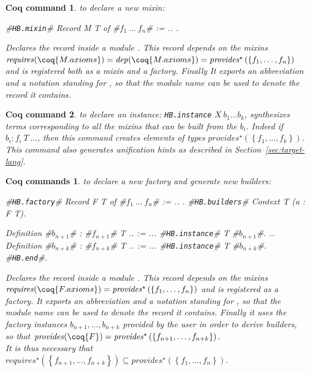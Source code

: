 \documentclass[a4paper,UKenglish,cleveref, autoref]{lipics-v2019}
\newcommand{\mixin}{mixin}
\newcommand{\mixins}{mixins}
\newcommand{\factory}{factory}
\newcommand{\phantterm}{abbreviation}
\newcommand{\mixinbuilders}{builders}
\newcommand{\factoryinstances}{factory instances}
\newcommand{\dep}{\ensuremath{\mathit{dep}}}
\newcommand{\requires}{\ensuremath{\mathit{requires}}}
\newcommand{\provides}{\ensuremath{\mathit{provides}}}
\newcommand{\set}[1]{\left\{#1\right\}}
\newcommand{\enum}[2]{\ensuremath{\set{#1,\ldots,#2}}}
\newcommand{\hbmixin}{{\tt\color{dkgreen}HB.mixin}}
\newcommand{\hbfactory}{{\tt\color{dkgreen}HB.factory}}
\newcommand{\hbinstance}{{\tt\color{dkgreen}HB.instance}}
\newcommand{\hbbuilders}{{\tt\color{dkgreen}HB.builders}}
\newcommand{\hbend}{{\tt\color{dkgreen}HB.end}}
\theoremstyle{implem}
\theoremstyle{implem}
\theoremstyle{command}
\newtheorem*{command}{Coq command}
\theoremstyle{commands}
\newtheorem*{commands}{Coq commands}
\begin{document}
\begin{command} to declare a new mixin:
\begin{coqcode}
#\hbmixin{}# Record M T of #$f_1\ \ldots\ f_n$# := { .. }.
\end{coqcode}
  Declares the record  inside a module .
  This record  depends on the \mixins{}
  \(\requires{}(\coq{M.axioms}) = \dep{}(\coq{M.axioms}) =
  \provides{}^\star\left(\enum{f_1}{f_n}\right)\)
  and is registered both as a \mixin{} and a \factory{}. Finally It exports an
  \phantterm{}  and a notation
   standing for , so that the module name can be used to
  denote the  record it contains.
\end{command}

\begin{command} to declare an instance: \hbinstance{}
  \(X\ b_1 \ldots b_k\), synthesizes terms corresponding to all the
  \mixins{} that can be built from the $b_i$. Indeed if
  \(b_i : f_i\ T\ \ldots\), then this command creates elements of types
  \(\provides{}^\star\left(\enum{f_1}{f_k}\right).\) This command also
  generates unification hints as described in
  Section~\ref{sec:target-lang}.
\end{command}

\begin{commands} to declare a new \factory{} and generate new \mixinbuilders:
\begin{coqcode}
#\hbfactory{}# Record F T of #$f_1\ \ldots\ f_n$# := { .. }.
#\hbbuilders{}# Context T (a : F T).

  Definition #$b_{n+1}$# : #$f_{n+1}$# T .. := ...
  #\hbinstance{}# T #$b_{n+1}$#.
  ..
  Definition #$b_{n+k}$# : #$f_{n+k}$# T .. := ...
  #\hbinstance{}# T #$b_{n+k}$#.
#\hbend{}#.
\end{coqcode}
  Declares the record  inside a module .
  This record  depends on the mixins
  \(\requires{}(\coq{F.axioms}) =
  \provides{}^\star\left(\enum{f_1}{f_n}\right)\) and is registered
  as a factory.  It exports an
  \phantterm{}  and a notation
   standing for , so that the module name can be used to
  denote the  record it contains.
  Finally it uses the \factoryinstances{}
  \(b_{n+1}, \ldots, b_{n+k}\) provided by the user in order to derive
  \mixinbuilders{}, so that
  \(\provides{}(\coq{F}) = \provides{}^\star\left(\enum{f_{n+1}}{f_{n+k}}\right).\)\\
  It is thus necessary that
  \(\requires{}^\star\left(\enum{f_{n+1}}{f_{n+k}}\right) \subseteq
  \provides{}^\star\left(\enum{f_1}{f_n}\right).\)
\end{commands}
\end{document}
